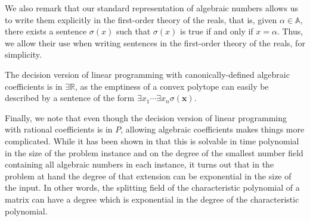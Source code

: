 We also remark that our standard representation of algebraic numbers
allows us to write them explicitly in the first-order theory of the
reals, that is, given $\alpha\in\mathbb{A}$, there exists a sentence
$\sigma(x)$ such that $\sigma(x)$ is true if and only if
$x=\alpha$. Thus, we allow their use when writing sentences in the
first-order theory of the reals, for simplicity.

The decision version of linear programming with canonically-defined algebraic coefficients is in $\exists\mathbb{R}$, as the emptiness of a convex polytope can easily be described by a sentence of the form $\exists x_1 \cdots \exists x_n \sigma(\boldsymbol{x})$.

Finally, we note that even though the decision version of linear
programming with rational coefficients is in $\mathit{P}$, allowing
algebraic coefficients makes things more complicated. While it has
been shown in \cite{AdlerB94} that this is solvable in time polynomial
in the size of the problem instance and on the degree of the smallest
number field containing all algebraic numbers in each instance, it
turns out that in the problem at hand the degree of that extension can
be exponential in the size of the input. In other words, the splitting
field of the characteristic polynomial of a matrix can have a degree
which is exponential in the degree of the characteristic polynomial.
